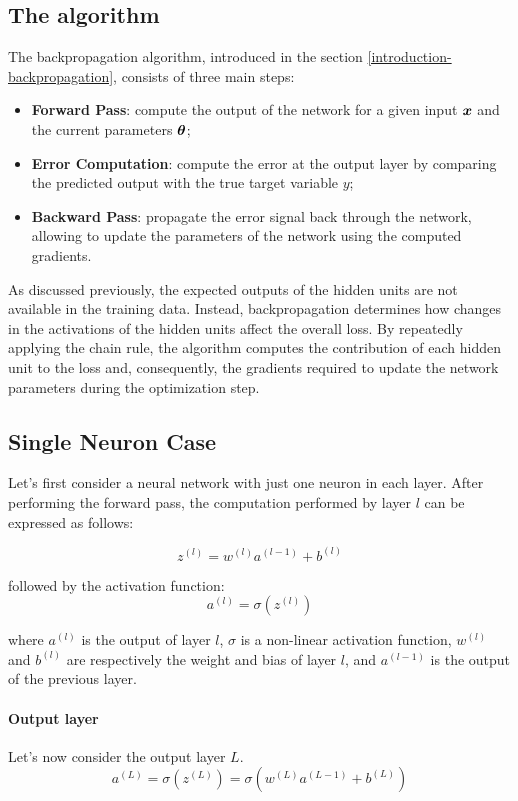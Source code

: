 \subsection{The algorithm}
The backpropagation algorithm, introduced in the section \ref{introduction-backpropagation}, consists of three main steps:
\begin{itemize}
    \item \textbf{Forward Pass}: compute the output of the network for a given input $\boldsymbol{x}$ and the current parameters $\boldsymbol{\theta}$;
    \item \textbf{Error Computation}: compute the error at the output layer by comparing the predicted output with the true target variable $y$;
    \item \textbf{Backward Pass}: propagate the error signal back through the network, allowing to update the parameters of the network using the computed gradients.
\end{itemize}
As discussed previously, the expected outputs of the hidden units are not available in the training data. Instead, backpropagation determines how changes in the activations of the hidden units affect the overall loss. By repeatedly applying the chain rule, the algorithm computes the contribution of each hidden unit to the loss and, consequently, the gradients required to update the network parameters during the optimization step.

\subsection{Single Neuron Case}
Let's first consider a neural network with just one neuron in each layer.
After performing the forward pass, the computation performed by layer $l$ can be expressed as follows:

\begin{equation*}
    z^{(l)} = w^{(l)} a^{(l-1)} + b^{(l)}
\end{equation*}

followed by the activation function:
\begin{equation*}
    a^{(l)} = \sigma(z^{(l)})
\end{equation*}

where $a^{(l)}$ is the output of layer $l$, $\sigma$ is a non-linear activation function,
$w^{(l)}$ and $b^{(l)}$ are respectively the weight and bias of layer $l$, and $a^{(l-1)}$ is the output of the previous layer.

\paragraph{Output layer}
Let's now consider the output layer $L$.
\[
    a^{(L)} = \sigma(z^{(L)}) = \sigma(w^{(L)} a^{(L-1)} + b^{(L)})
\]


